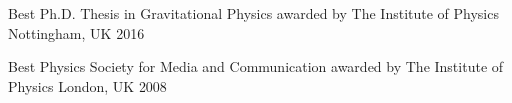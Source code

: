 



\begin{cvhonors}

  \cvhonor
    {Best Ph.D. Thesis in Gravitational Physics awarded by The Institute of Physics} %
    {} %
    {Nottingham, UK} %
    {2016} %

\end{cvhonors}




\begin{cvhonors}

  \cvhonor
    {Best Physics Society for Media and Communication awarded by The Institute of Physics} %
    {} %
    {London, UK} %
    {2008} %


\end{cvhonors}
